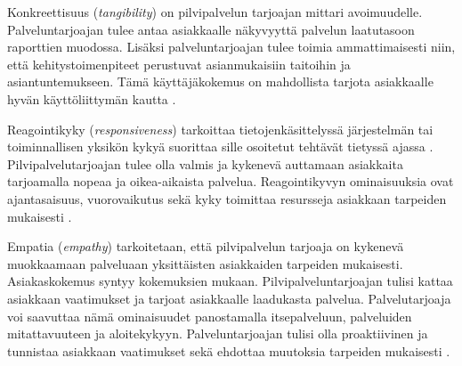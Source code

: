 Konkreettisuus (\emph{tangibility}) on pilvipalvelun tarjoajan mittari avoimuudelle. Palveluntarjoajan tulee antaa asiakkaalle näkyvyyttä palvelun laatutasoon raporttien muodossa. Lisäksi palveluntarjoajan tulee toimia ammattimaisesti niin, että kehitystoimenpiteet perustuvat asianmukaisiin taitoihin ja asiantuntemukseen. Tämä käyttäjäkokemus on mahdollista tarjota asiakkaalle hyvän käyttöliittymän kautta \citep{qualitymodel}.

Reagointikyky (\emph{responsiveness}) tarkoittaa tietojenkäsittelyssä järjestelmän tai toiminnallisen yksikön kykyä suorittaa sille osoitetut tehtävät tietyssä ajassa \citep{dictionary}. Pilvipalvelutarjoajan tulee olla valmis ja kykenevä auttamaan asiakkaita tarjoamalla nopeaa ja oikea-aikaista palvelua. Reagointikyvyn ominaisuuksia ovat ajantasaisuus, vuorovaikutus sekä kyky toimittaa resursseja asiakkaan tarpeiden mukaisesti \citep{qualitymodel}.

Empatia (\emph{empathy}) tarkoitetaan, että pilvipalvelun tarjoaja on kykenevä muokkaamaan palveluaan yksittäisten asiakkaiden tarpeiden mukaisesti. Asiakaskokemus syntyy kokemuksien mukaan. Pilvipalveluntarjoajan tulisi kattaa asiakkaan vaatimukset ja tarjoat asiakkaalle laadukasta palvelua. Palvelutarjoaja voi saavuttaa nämä ominaisuudet panostamalla itsepalveluun, palveluiden mitattavuuteen ja aloitekykyyn. Palveluntarjoajan tulisi olla proaktiivinen ja tunnistaa asiakkaan vaatimukset sekä ehdottaa muutoksia tarpeiden mukaisesti \citep{qualitymodel}.
